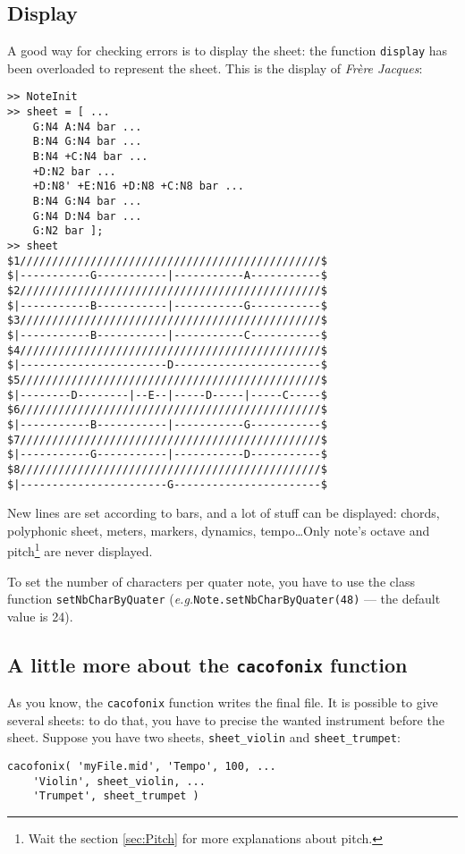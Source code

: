 \documentclass{article}
\newcommand{\frerejaques}{\emph{Fr\`ere Jacques}\xspace}
\newcommand{\eg}{\emph{e.g.}\xspace}
\begin{document}
\subsection{Display}

A good way for checking errors is to display the sheet: the function \lstinline!display! has been overloaded to represent the sheet. This is the display of \frerejaques:
\begin{lstlisting}
>> NoteInit
>> sheet = [ ...
	G:N4 A:N4 bar ...
	B:N4 G:N4 bar ...
	B:N4 +C:N4 bar ...
	+D:N2 bar ...
	+D:N8' +E:N16 +D:N8 +C:N8 bar ...
	B:N4 G:N4 bar ...
	G:N4 D:N4 bar ...
	G:N2 bar ];
>> sheet
$1///////////////////////////////////////////////$
$|-----------G-----------|-----------A-----------$
$2///////////////////////////////////////////////$
$|-----------B-----------|-----------G-----------$
$3///////////////////////////////////////////////$
$|-----------B-----------|-----------C-----------$
$4///////////////////////////////////////////////$
$|-----------------------D-----------------------$
$5///////////////////////////////////////////////$
$|--------D--------|--E--|-----D-----|-----C-----$
$6///////////////////////////////////////////////$
$|-----------B-----------|-----------G-----------$
$7///////////////////////////////////////////////$
$|-----------G-----------|-----------D-----------$
$8///////////////////////////////////////////////$
$|-----------------------G-----------------------$
\end{lstlisting}

New lines are set according to bars, and a lot of stuff can be displayed: chords, polyphonic sheet, meters, markers, dynamics, tempo\dots Only note's octave and pitch\footnote{Wait the section \ref{sec:Pitch} for more explanations about pitch.} are never displayed.

To set the number of characters per quater note, you have to use the class function \lstinline!setNbCharByQuater! (\eg \lstinline!Note.setNbCharByQuater(48)! --- the default value is 24).

\subsection{A little more about the \lstinline!cacofonix! function}

As you know, the \lstinline!cacofonix! function writes the final file. It is possible to give several sheets: to do that, you have to precise the wanted instrument before the sheet. Suppose you have two sheets, \lstinline!sheet_violin! and \lstinline!sheet_trumpet!:
\begin{lstlisting}
cacofonix( 'myFile.mid', 'Tempo', 100, ...
	'Violin', sheet_violin, ...
	'Trumpet', sheet_trumpet )
\end{lstlisting}
\end{document}

